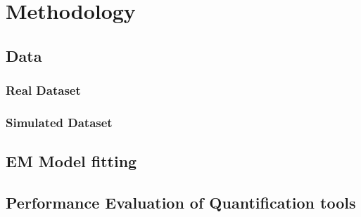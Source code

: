 \chapter{Methodology}
\label{sec:methodology} 

\section{Data}
\label{sec:data}

\subsection{Real Dataset}
\label{sec:realdataset}

\subsection{Simulated Dataset}
\label{sec:simdataset}

\section{EM Model fitting}
\label{sec:modelfitting}

\section{Performance Evaluation of Quantification tools}
\label{sec:performanceeval}
